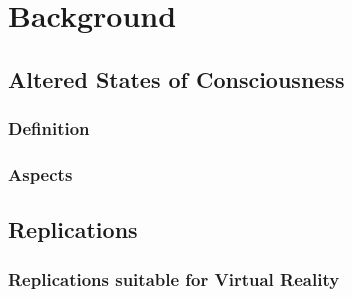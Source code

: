 \chapter{Background}
\vspace{-1.6em}
%

\minitoc
\thispagestyle{empty}
\newpage

\section{Altered States of Consciousness}
\subsection{Definition}
\subsection{Aspects}
\section{Replications}
\subsection{Replications suitable for Virtual Reality}
